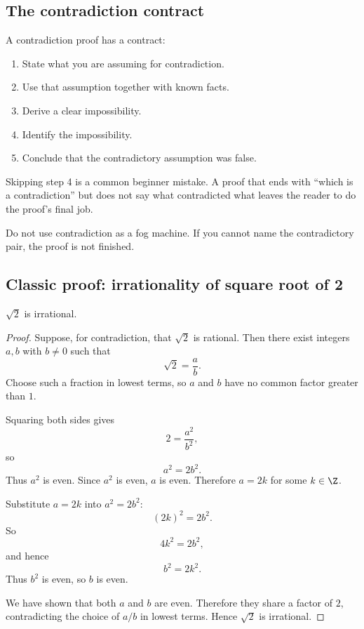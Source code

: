 \subsection{The contradiction contract}

A contradiction proof has a contract:

\begin{enumerate}
\item State what you are assuming for contradiction.
\item Use that assumption together with known facts.
\item Derive a clear impossibility.
\item Identify the impossibility.
\item Conclude that the contradictory assumption was false.
\end{enumerate}

Skipping step 4 is a common beginner mistake. A proof that ends with ``which is a contradiction'' but does not say what contradicted what leaves the reader to do the proof's final job.

\begin{trapbox}
Do not use contradiction as a fog machine. If you cannot name the contradictory pair, the proof is not finished.
\end{trapbox}

\subsection{Classic proof: irrationality of square root of 2}

\begin{theorem}
$\sqrt2$ is irrational.
\end{theorem}

\begin{proof}
Suppose, for contradiction, that $\sqrt2$ is rational. Then there exist integers $a,b$ with $b\neq0$ such that
\[
\sqrt2=\frac ab.
\]
Choose such a fraction in lowest terms, so $a$ and $b$ have no common factor greater than $1$.

Squaring both sides gives
\[
2=\frac{a^2}{b^2},
\]
so
\[
a^2=2b^2.
\]
Thus $a^2$ is even. Since $a^2$ is even, $a$ is even. Therefore $a=2k$ for some $k\in\Z$.

Substitute $a=2k$ into $a^2=2b^2$:
\[
(2k)^2=2b^2.
\]
So
\[
4k^2=2b^2,
\]
and hence
\[
b^2=2k^2.
\]
Thus $b^2$ is even, so $b$ is even.

We have shown that both $a$ and $b$ are even. Therefore they share a factor of $2$, contradicting the choice of $a/b$ in lowest terms. Hence $\sqrt2$ is irrational.
\end{proof}

